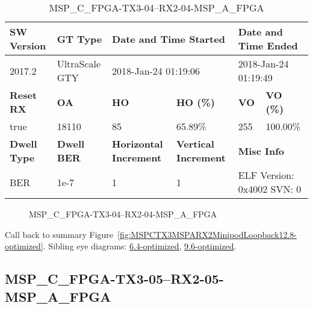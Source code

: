 \begin{table}[h]
\centering
\caption{MSP\_C\_FPGA-TX3-04--RX2-04-MSP\_A\_FPGA}
\label{tab:MSPCFPGATX304RX204MSPAFPGA12.8-optimized}
\begin{tabular}{@{}|l|l|l|l|l|l|@{}}
\toprule
\textbf{SW Version}                & \textbf{GT Type}   & \multicolumn{2}{l|}{\textbf{Date and Time Started}}            & \multicolumn{2}{l|}{\textbf{Date and Time Ended}}        \\ \midrule
2017.2                       & UltraScale GTY          & \multicolumn{2}{l|}{2018-Jan-24 01:19:06}                   & \multicolumn{2}{l|}{2018-Jan-24 01:19:49}               \\ \midrule
\textbf{Reset RX}                  & \textbf{OA} & \textbf{HO}   & \textbf{HO (\%)} & \textbf{VO} & \textbf{VO (\%)} \\ \midrule
true & 18110        & 85          & 65.89\%        & 255        & 100.00\%       \\ \midrule
\textbf{Dwell Type}                & \textbf{Dwell BER} & \textbf{Horizontal Increment} & \textbf{Vertical Increment}    & \multicolumn{2}{l|}{\textbf{Misc Info}}                  \\ \midrule
BER                            & 1e-7        & 1        & 1           & \multicolumn{2}{l|}{ELF Version: 0x4002 SVN: 0}                         \\ \bottomrule
\end{tabular}
\end{table}

\begin{figure}[h]
\caption{MSP\_C\_FPGA-TX3-04--RX2-04-MSP\_A\_FPGA} \label{fig:MSPCFPGATX304RX204MSPAFPGA12.8-optimized}
\end{figure}

Call back to summary Figure~\ref{fig:MSPCTX3MSPARX2MinipodLoopback12.8-optimized}.
Sibling eye diagrams: \hyperref[sec:MSPCFPGATX304RX204MSPAFPGA6.4-optimized]{6.4-optimized}, \hyperref[sec:MSPCFPGATX304RX204MSPAFPGA9.6-optimized]{9.6-optimized}.

\clearpage
\newpage


\subsection{MSP\_C\_FPGA-TX3-05--RX2-05-MSP\_A\_FPGA}\label{sec:MSPCFPGATX305RX205MSPAFPGA12.8-optimized}

